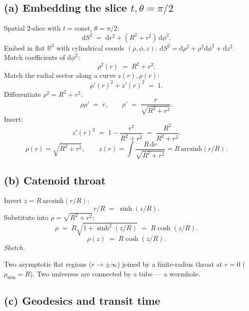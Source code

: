 \documentclass[11pt]{article}
\newcommand{\de}{\mathrm{d}}
\begin{document}
\subsection*{(a) Embedding the slice $t,\theta=\pi/2$}

Spatial 2-slice with $t=$const, $\theta=\pi/2$:
\[
\de S^2 \;=\; \de r^2 + (R^2+r^2)\,\de\phi^2.
\]
Embed in flat $\mathbb R^3$ with cylindrical coords $(\rho,\phi,z)$: $\de S^2=\de\rho^2+\rho^2\de\phi^2+\de z^2$. Match coefficients of $\de\phi^2$:
\[
\rho^2(r) \;=\; R^2+r^2.
\]
Match the radial sector along a curve $z(r),\rho(r)$:
\[
\rho'(r)^2 + z'(r)^2 \;=\; 1.
\]
Differentiate $\rho^2=R^2+r^2$:
\[
\rho\rho' \;=\; r,\qquad \rho' \;=\; \frac{r}{\sqrt{R^2+r^2}}.
\]
Insert:
\[
z'(r)^2 \;=\; 1 - \frac{r^2}{R^2+r^2} \;=\; \frac{R^2}{R^2+r^2}.
\]
\begin{equation}
\boxed{\;\rho(r)=\sqrt{R^2+r^2},\qquad z(r)=\int\!\frac{R\,\de r}{\sqrt{R^2+r^2}}=R\,\text{arcsinh}(r/R).\;}
\label{eq:embed}
\end{equation}

\subsection*{(b) Catenoid throat}

Invert $z=R\,\text{arcsinh}(r/R)$:
\[
r/R \;=\; \sinh(z/R).
\]
Substitute into $\rho=\sqrt{R^2+r^2}$:
\[
\rho \;=\; R\sqrt{1+\sinh^2(z/R)} \;=\; R\cosh(z/R).
\]
\begin{equation}
\boxed{\;\rho(z) \;=\; R\cosh(z/R).\;}
\label{eq:catenoid}
\end{equation}
\textit{Sketch.}
\begin{center}
\end{center}
Two asymptotic flat regions ($r\to\pm\infty$) joined by a finite-radius throat at $r=0$ ($\rho_{\min}=R$). Two universes are connected by a tube --- a wormhole.

\subsection*{(c) Geodesics and transit time}
\end{document}
